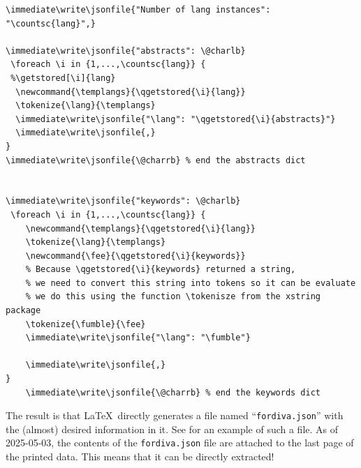 \begin{lstlisting}[language={[LaTeX]TeX}, caption={Writing out the language, abstract, and keywords information}, label=lst:writinglangAndKeywords]
\immediate\write\jsonfile{"Number of lang instances": "\countsc{lang}",}

\immediate\write\jsonfile{"abstracts": \@charlb}
 \foreach \i in {1,...,\countsc{lang}} {
 %\getstored[\i]{lang}
  \newcommand{\templangs}{\qgetstored{\i}{lang}}
  \tokenize{\lang}{\templangs}
  \immediate\write\jsonfile{"\lang": "\qgetstored{\i}{abstracts}"}
  \immediate\write\jsonfile{,}
}
\immediate\write\jsonfile{\@charrb} % end the abstracts dict


\immediate\write\jsonfile{"keywords": \@charlb}
 \foreach \i in {1,...,\countsc{lang}} {
    \newcommand{\templangs}{\qgetstored{\i}{lang}}
    \tokenize{\lang}{\templangs}
    \newcommand{\fee}{\qgetstored{\i}{keywords}}
    % Because \qgetstored{\i}{keywords} returned a string,
    % we need to convert this string into tokens so it can be evaluate
    % we do this using the function \tokenisze from the xstring package
    \tokenize{\fumble}{\fee}
    \immediate\write\jsonfile{"\lang": "\fumble"}

    \immediate\write\jsonfile{,}
}
    \immediate\write\jsonfile{\@charrb} % end the keywords dict
\end{lstlisting}	


The result is that \LaTeX~directly generates a file named “\texttt{fordiva.json}” with the (almost) desired information in it. See  for an example of such a file. As of 2025-05-03, the contents of the \texttt{fordiva.json} file are attached to the last page of the printed data. This means that it can be directly extracted!

